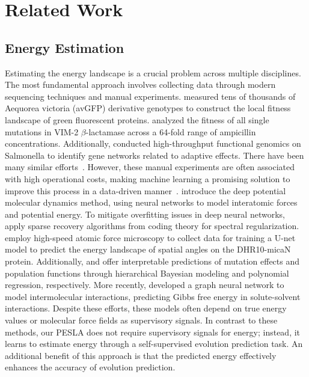 \section{Related Work}
\subsection{Energy Estimation}

Estimating the energy landscape is a crucial problem across multiple disciplines. The most fundamental approach involves collecting data through modern sequencing techniques and manual experiments. \citet{sarkisyan2016local} measured tens of thousands of Aequorea victoria (avGFP) derivative genotypes to construct the local fitness landscape of green fluorescent proteins. \citet{chen2022environmental} analyzed the fitness of all single mutations in VIM-2 $\beta$-lactamase across a 64-fold range of ampicillin concentrations. Additionally, \citet{wang2024high} conducted high-throughput functional genomics on Salmonella to identify gene networks related to adaptive effects. There have been many similar efforts~\citep{starr2018pervasive}. However, these manual experiments are often associated with high operational costs, making machine learning a promising solution to improve this process in a data-driven manner~\citep{rupp2012fast, han2023synergistic}. \citet{zhang2018deep} introduce the deep potential molecular dynamics method, using neural networks to model interatomic forces and potential energy. To mitigate overfitting issues in deep neural networks, \citet{aghazadeh2021epistatic} apply sparse recovery algorithms from coding theory for spectral regularization. \citet{zhang2022rotational} employ high-speed atomic force microscopy to collect data for training a U-net model to predict the energy landscape of spatial angles on the DHR10-micaN protein. Additionally, \citet{tonner2022interpretable} and \citet{skwara2023statistically} offer interpretable predictions of mutation effects and population functions through hierarchical Bayesian modeling and polynomial regression, respectively. More recently, \citet{ijcai2024p642} developed a graph neural network to model intermolecular interactions, predicting Gibbs free energy in solute-solvent interactions. Despite these efforts, these models often depend on true energy values or molecular force fields as supervisory signals. In contrast to these methods, our PESLA does not require supervisory signals for energy; instead, it learns to estimate energy through a self-supervised evolution prediction task. An additional benefit of this approach is that the predicted energy effectively enhances the accuracy of evolution prediction.


